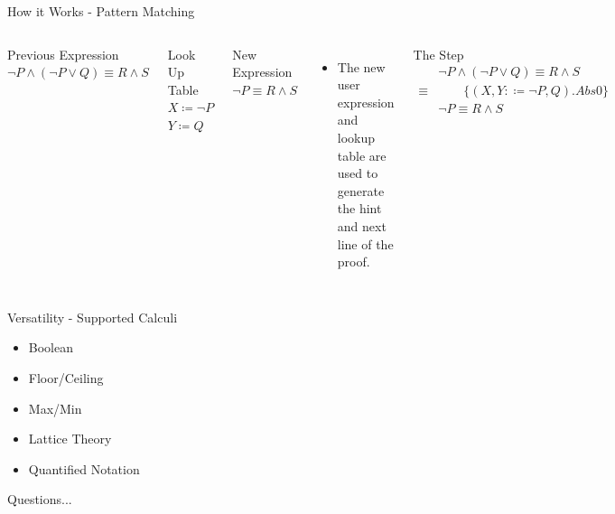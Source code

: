 \documentclass[11pt]{beamer}
\begin{document}
\begin{frame}{How it Works - Pattern Matching}

\begin{columns}[c]

\begin{block}{Previous Expression}
$\neg P \wedge ( \neg P \vee Q ) \equiv R \wedge S $
\end{block}
\begin{block}{Look Up Table}
$X \coloneq \neg P$\\
$Y \coloneq Q$
\end{block}
\begin{block}{New Expression}
$\neg P \equiv R \wedge S $
\end{block}


\begin{itemize}
\item \large{The new user expression and lookup table are used to generate the hint and next line of the proof.}
\end{itemize}
\begin{block}{The Step}
\begin{align*}
&\neg P \wedge ( \neg P \vee Q ) \equiv R \wedge S \\
\equiv&\qquad\{(X, Y :\coloneqq \neg P, Q ).Abs0\} \\
&\neg P \equiv R \wedge S 
\end{align*}
\end{block}

\end{columns}

\end{frame}


\begin{frame}{Versatility - Supported Calculi}
\begin{itemize}
\setlength\itemsep{2em}
\item \Large{Boolean}
\item \Large{Floor/Ceiling}
\item \Large{Max/Min}
\item \Large{Lattice Theory}
\item \Large{Quantified Notation}
\end{itemize}
\end{frame}

\begin{frame}
\Huge{\centerline{Questions...}}
\end{frame}
\end{document}
